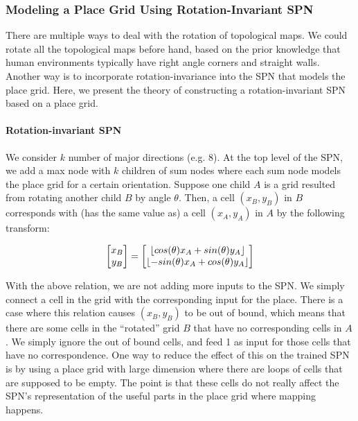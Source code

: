 \documentclass[10pt, titlepage]{article}
\theoremstyle{definition}
\DeclarePairedDelimiter\floor{\lfloor}{\rfloor}
\begin{document}
\subsubsection{Modeling a Place Grid Using Rotation-Invariant SPN}

There are multiple ways to deal with the rotation of topological maps. We could rotate all the topological maps before hand, based on the prior knowledge that human environments typically have right angle corners and straight walls. Another way is to incorporate rotation-invariance into the SPN that models the place grid. Here, we present the theory of constructing a rotation-invariant SPN based on a place grid.

\paragraph{Rotation-invariant SPN} We consider $k$ number of major directions (e.g. 8). At the top level of the SPN, we add a max node with $k$ children of sum nodes where each sum node models the place grid for a certain orientation. Suppose one child $A$ is a grid resulted from rotating another child $B$ by angle $\theta$. Then, a cell $(x_B, y_B)$ in $B$ corresponds with (has the same value as) a cell $(x_A, y_A)$ in $A$ by the following transform:

\begin{equation}
\begin{bmatrix}
x_B \\
y_B \\
\end{bmatrix}
=
\begin{bmatrix}
\floor{cos(\theta)x_A+sin(\theta)y_A}\\
\floor{-sin(\theta)x_A+cos(\theta)y_A}\\
\end{bmatrix}
\end{equation}

With the above relation, we are not adding more inputs to the SPN. We simply connect a cell in the grid with the corresponding input for the place. There is a case where this relation causes $(x_B, y_B)$ to be out of bound, which means that there are some cells in the ``rotated'' grid $B$ that have no corresponding cells in $A$. We simply ignore the out of bound cells, and feed 1 as input for those cells that have no correspondence. One way to reduce the effect of this on the trained SPN is by using a place grid with large dimension where there are loops of cells that are supposed to be empty. The point is that these cells do not really affect the SPN's representation of the useful parts in the place grid where mapping happens.
\end{document}

